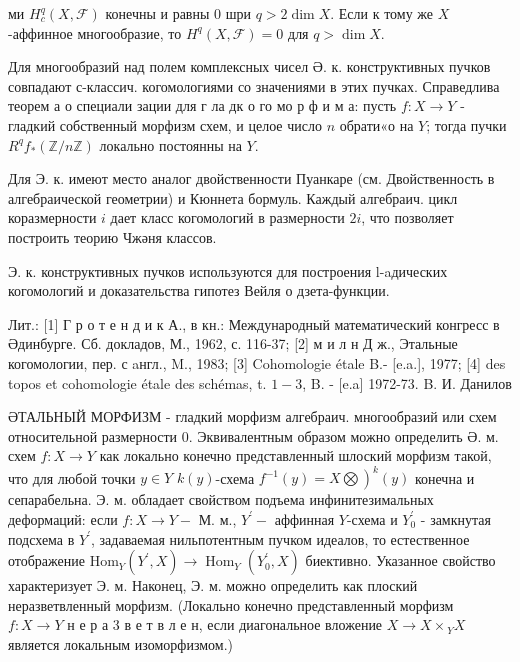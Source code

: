 \documentclass[10pt]{article}
\begin{document}
ми $H_{c}^{q}(X, \mathscr{F})$ конечны и равны 0 шри $q>2 \operatorname{dim} X$. Если к тому же $X$-аффинное многообразие, то $H^{q}(X, \mathscr{F})=0$ для $q>\operatorname{dim} X$.



Для многообразий над полем комплексных чисел Ә. к. конструктивных пучков совпадают с-классич. когомологиями со значениями в этих пучках. Справедлива теорем а о специали зации для г ла дк о го мо р ф и м а: пусть $f: X \rightarrow Y$ - гладкий собственный морфизм схем, и целое число $n$ обрати«о на $Y$; тогда пучки $R^{q} f_{*}(\mathbb{Z} / n \mathbb{Z})$ локально постоянны на $Y$.



Для Э. к. имеют место аналог двойственности Пуанкаре (см. Двойственность в алгебраической геометрии) и Кюннета бормуль. Каждый алгебраич. цикл коразмерности $i$ дает класс когомологий в размерности $2 i$, что позволяет построить теорию Чжәня классов.



Э. к. конструктивных пучков используются для построения l-aдических когомологий и доказательства гипотез Вейля о дзета-функции.



Лит.: [1] Г р о т е н д и к А., в кн.: Международный математический конгресс в Әдинбурге. Сб. докладов, М., 1962, с. 116-37; [2] м и л н Д ж., Этальные когомологии, пер. с aнгл., M., 1983; [3] Cohomologie étale B.- [e.a.], 1977; [4] des topos et cohomologie étale des schémas, t. $1-3$, B. - [e.a] 1972-73. B. И. Данилов



ӘТАЛЬНЫЙ МОРФИЗМ - гладкий морфизм алгебраич. многообразий или схем относительной размерности 0. Эквивалентным образом можно определить Ә. м. схем $f: X \rightarrow Y$ как локально конечно представленный шлоский морфизм такой, что для любой точки $y \in Y$ $k(y)$-схема $\left.f^{-1}(y)=X \bigotimes\right)^{k}(y)$ конечна и сепарабельна. Э. м. обладает свойством подъема инфинитезимальных деформаций: если $f: X \rightarrow Y-$ М. м., $Y^{\prime}-$ аффинная $Y$-схема и $Y_{0}^{\prime}$ - замкнутая подсхема в $Y^{\prime}$, задаваемая нильпотентным пучком идеалов, то естественное отображение $\mathrm{Hom}_{Y}\left(Y^{\prime}, X\right) \rightarrow \operatorname{Hom}_{Y}\left(Y_{0}^{\prime}, X\right)$ биективно. Указанное свойство характеризует Э. м. Наконец, Э. м. можно определить как плоский неразветвленный морфизм. (Локально конечно представленный морфизм $f: X \rightarrow Y$ н е р а 3 в е т в л е н, если диагональное вложение $X \rightarrow X \times{ }_{Y} X$ является локальным изоморфизмом.)
\end{document}
